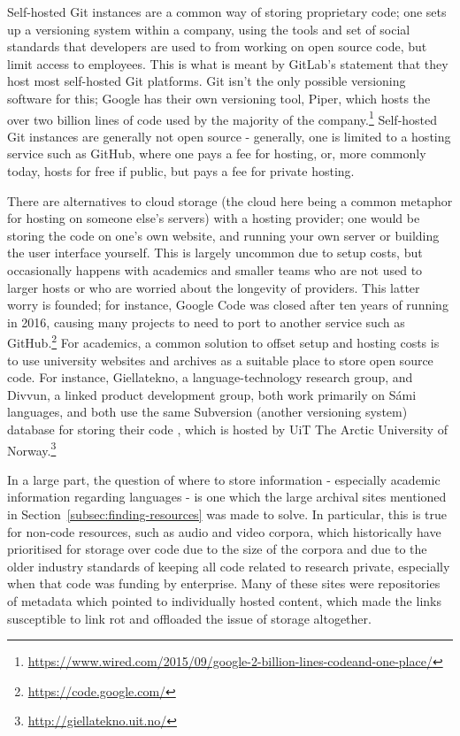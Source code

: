 Self-hosted Git instances are a common way of storing proprietary code; one sets up a versioning system within a company, using the tools and set of social standards that developers are used to from working on open source code, but limit access to employees. This is what is meant by GitLab's statement that they host most self-hosted Git platforms. Git isn't the only possible versioning software for this; Google has their own versioning tool, Piper, which hosts the over two billion lines of code used by the majority of the company.\footnote{\href{https://www.wired.com/2015/09/google-2-billion-lines-codeand-one-place/}{https://www.wired.com/2015/09/google-2-billion-lines-codeand-one-place/}} Self-hosted Git instances are generally not open source - generally, one is limited to a hosting service such as GitHub, where one pays a fee for hosting, or, more commonly today, hosts for free if public, but pays a fee for private hosting.

There are alternatives to cloud storage (the cloud here being a common metaphor for hosting on someone else's servers) with a hosting provider; one would be storing the code on one's own website, and running your own server or building the user interface yourself. This is largely uncommon due to setup costs, but occasionally happens with academics and smaller teams who are not used to larger hosts or who are worried about the longevity of providers. This latter worry is founded; for instance, Google Code was closed after ten years of running in 2016, causing many projects to need to port to another service such as GitHub.\footnote{\href{https://code.google.com/}{https://code.google.com/}} For academics, a common solution to offset setup and hosting costs is to use university websites and archives as a suitable place to store open source code. For instance, Giellatekno, a language-technology research group, and Divvun, a linked product development group, both work primarily on S\'ami languages, and both use the same Subversion (another versioning system) database for storing their code \citep{moshagenopen}, which is hosted by UiT The Arctic University of Norway.\footnote{\href{http://giellatekno.uit.no/}{http://giellatekno.uit.no/}}

In a large part, the question of where to store information - especially academic information regarding languages - is one which the large archival sites mentioned in Section~\ref{subsec:finding-resources} was made to solve. In particular, this is true for non-code resources, such as audio and video corpora, which historically have prioritised for storage over code due to the size of the corpora and due to the older industry standards of keeping all code related to research private, especially when that code was funding by enterprise. Many of these sites were repositories of metadata which pointed to individually hosted content, which made the links susceptible to link rot and offloaded the issue of storage altogether.

